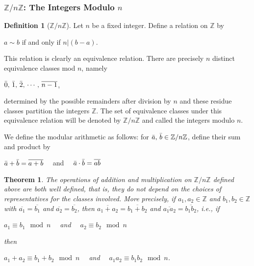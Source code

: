 \documentclass[paper=a4, fontsize=11pt]{scrartcl}
\newtheorem{theorem}{Theorem}[section]
\numberwithin{equation}{section}		%
\numberwithin{figure}{section}			%
\numberwithin{table}{section}				%
\theoremstyle{definition}
\newtheorem{definition}{Definition}[section]
\theoremstyle{remark}
\theoremstyle{example}
\begin{document}
\newpage
\subsubsection{$\mathbb{Z}/n\mathbb{Z}$: The Integers Modulo $n$}

\begin{definition}[\textbf{$\mathbb{Z}/n\mathbb{Z}$}]
    Let $n$ be a fixed integer. Define a relation on $\mathbb{Z}$ by
    \begin{center}
        $a \sim b$ if and only if $n\lvert (b-a)$.
    \end{center}
    This relation is clearly an equivalence relation. There are precisely $n$ distinct equivalence classes mod $n$, namely
    \begin{center}
        $\Bar{0},\,\Bar{1},\,\Bar{2},\,\cdots,\,\overline{n-1}$,
    \end{center}
    determined by the possible remainders after division by $n$ and these residue classes partition the integers $\mathbb{Z}$. The set of equivalence classes under this equivalence relation will be denoted by \textbf{$\mathbb{Z}/n\mathbb{Z}$} and called the integers modulo $n$.
    
    We define the modular arithmetic as follows: for $\Bar{a},\,\Bar{b}\in\mathbb{Z}/n\mathbb{Z}$, define their sum and product by
    \begin{center}
        $\Bar{a}+\Bar{b} = \overline{a+b}\quad$ and $\quad\Bar{a}\cdot\Bar{b} = \overline{ab}$
    \end{center}
\end{definition}

\begin{theorem}
    The operations of addition and multiplication on $\mathbb{Z}/n\mathbb{Z}$ defined above are both well defined, that is, they do not depend on the choices of representatives for the classes involved. More precisely, if $a_1,a_2 \in \mathbb{Z}$ and $b_1,b_2\in \mathbb{Z}$ with $\overline{a_1} = \overline{b_1}$ and $\overline{a_2} = \overline{b_2}$, then $\overline{a_1+a_2} = \overline{b_1+b_2}$ and $\overline{a_1a_2} = \overline{b_1b_2}$, i.e., if 
    \begin{center}
        $a_1 \equiv b_1\mod n\quad$ and $\quad a_2 \equiv b_2 \mod n$
    \end{center}
    then
    \begin{center}
        $a_1+a_2 \equiv b_1+b_2 \mod n\quad$ and $\quad a_1a_2 \equiv b_1b_2 \mod n$.
    \end{center}
\end{theorem}
\end{document}
